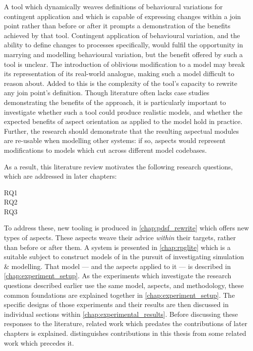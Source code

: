 A tool which dynamically weaves definitions of behavioural variations for
contingent application and which is capable of expressing changes within a join
point rather than before or after it prompts a demonstration of the benefits
achieved by that tool. Contingent application of behavioural variation, and the
ability to define changes to processes specifically, would fulfil the
opportunity in marrying \aspectorientation{} and modelling behavioural
variation, but the benefit offered by such a tool is unclear. The introduction
of oblivious modification to a model may break its representation of its
real-world analogue, making such a model difficult to reason about. Added to
this is the complexity of the tool's capacity to rewrite any join point's
definition. Though \aop{} literature often lacks case studies demonstrating the
benefits of the approach, it is particularly important to investigate whether
such a tool could produce realistic models, and whether the expected benefits of
aspect orientation as applied to the model hold in practice. Further, the
research should demonstrate that the resulting aspectual modules are re-usable
when modelling other systems: if so, aspects would represent modifications to
models which cut across different model codebases.

As a result, this literature review motivates the following research questions,
which are addressed in later chapters:

\begin{researchquestion}
\begin{description}
  \item[RQ1] \rqtwo{}
  \item[RQ2] \rqthree{}
  \item[RQ3] \rqfour{}
\end{description}
\end{researchquestion}

To address these, new tooling is produced in \cref{chap:pdsf_rewrite} which
offers new types of aspects. These aspects weave their advice \emph{within}
their targets, rather than before or after them. A system is presented in
\cref{chap:rpglite} which is a suitable subject to construct models of in the
pursuit of investigating \aspectoriented{} simulation \& modelling. That model
--- and the aspects applied to it --- is described in
\cref{chap:experiment_setup}. As the experiments which investigate the research
questions described earlier use the same model, aspects, and methodology, these
common foundations are explained together in \cref{chap:experiment_setup}. The
specific designs of those experiments and their results are then discussed in
individual sections within \cref{chap:experimental_results}. Before discussing
these responses to the literature, related work which predates the contributions
of later chapters is explained.  distinguishes
contributions in this thesis from some related work which precedes it.
